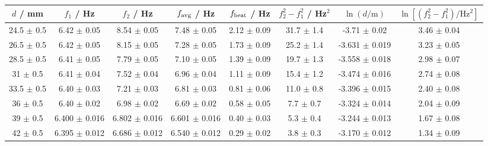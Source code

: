 \begin{tabular}{@{}cccccccc@{}}
\toprule
$d$ / mm & $f_1$ / Hz & $f_2$ / Hz & $f_{\rm avg}$ / Hz & $f_{\rm beat}$ / Hz & $f_2^2-f_1^2$ / Hz$^2$ & $\ln(d/\mathrm{m})$ & $\ln[(f_2^2-f_1^2)/\mathrm{Hz^2}]$ \\
\midrule
24.5 $\pm$ 0.5 & 6.42 $\pm$ 0.05 & 8.54 $\pm$ 0.05 & 7.48 $\pm$ 0.05 & 2.12 $\pm$ 0.09 & 31.7 $\pm$ 1.4 & -3.71 $\pm$ 0.02 & 3.46 $\pm$ 0.04 \\
26.5 $\pm$ 0.5 & 6.42 $\pm$ 0.05 & 8.15 $\pm$ 0.05 & 7.28 $\pm$ 0.05 & 1.73 $\pm$ 0.09 & 25.2 $\pm$ 1.4 & -3.631 $\pm$ 0.019 & 3.23 $\pm$ 0.05 \\
28.5 $\pm$ 0.5 & 6.41 $\pm$ 0.05 & 7.79 $\pm$ 0.05 & 7.10 $\pm$ 0.05 & 1.39 $\pm$ 0.09 & 19.7 $\pm$ 1.3 & -3.558 $\pm$ 0.018 & 2.98 $\pm$ 0.07 \\
31 $\pm$ 0.5 & 6.41 $\pm$ 0.04 & 7.52 $\pm$ 0.04 & 6.96 $\pm$ 0.04 & 1.11 $\pm$ 0.09 & 15.4 $\pm$ 1.2 & -3.474 $\pm$ 0.016 & 2.74 $\pm$ 0.08 \\
33.5 $\pm$ 0.5 & 6.40 $\pm$ 0.03 & 7.21 $\pm$ 0.03 & 6.81 $\pm$ 0.03 & 0.81 $\pm$ 0.06 & 11.0 $\pm$ 0.8 & -3.396 $\pm$ 0.015 & 2.40 $\pm$ 0.08 \\
36 $\pm$ 0.5 & 6.40 $\pm$ 0.02 & 6.98 $\pm$ 0.02 & 6.69 $\pm$ 0.02 & 0.58 $\pm$ 0.05 & 7.7 $\pm$ 0.7 & -3.324 $\pm$ 0.014 & 2.04 $\pm$ 0.09 \\
39 $\pm$ 0.5 & 6.400 $\pm$ 0.016 & 6.802 $\pm$ 0.016 & 6.601 $\pm$ 0.016 & 0.40 $\pm$ 0.03 & 5.3 $\pm$ 0.4 & -3.244 $\pm$ 0.013 & 1.67 $\pm$ 0.08 \\
42 $\pm$ 0.5 & 6.395 $\pm$ 0.012 & 6.686 $\pm$ 0.012 & 6.540 $\pm$ 0.012 & 0.29 $\pm$ 0.02 & 3.8 $\pm$ 0.3 & -3.170 $\pm$ 0.012 & 1.34 $\pm$ 0.09 \\
\bottomrule
\end{tabular}